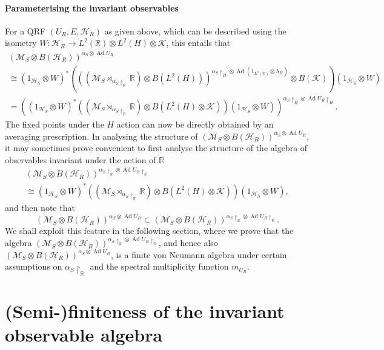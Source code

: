 \documentclass[sn-mathphys-num]{sn-jnl}%
\newcommand{\RR}{\mathbb{R}}
\newcommand{\HH}{\mathcal{H}}
\newcommand{\KK}{\mathcal{K}}
\newcommand{\MM}{\mathcal{M}}
\DeclareMathOperator{\Ad}{Ad}
\numberwithin{equation}{section}
\theoremstyle{thmstyleone}%
\theoremstyle{thmstyletwo}%
\theoremstyle{thmstylethree}%
\begin{document}
\paragraph{Parameterising the invariant observables} For a QRF $(U_R,E,\HH_R)$ as given above, which can be described using the isometry $W:\HH_R\to L^2(\RR)\otimes L^2(H)\otimes \KK$, this entails that
\begin{multline}
    \left(\MM_S\otimes B(\HH_R)\right)^{\alpha_S\otimes \Ad U_R}\\\cong(1_{\HH_S}\otimes W)^*\left(\left((\MM_S\rtimes_{\alpha_S\restriction_{\RR}} \RR)\otimes B( L^2(H))\right)^{\alpha_S\restriction_H\otimes \Ad (1_{L^2(\RR)}\otimes \lambda_H)}\otimes B(\KK)\right)(1_{\HH_S}\otimes W)\\=\left((1_{\HH_S}\otimes W)^*\left((\MM_S\rtimes_{\alpha_S\restriction_{\RR}} \RR)\otimes B( L^2(H)\otimes \KK)\right)(1_{\HH_S}\otimes W)\right)^{\alpha_S\restriction_H\otimes\Ad U_R\restriction_H}.
\end{multline}
The fixed points under the $H$ action can now be directly obtained by an averaging prescription. In analysing the structure of $\left(\MM_S\otimes B(\HH_R)\right)^{\alpha_S\otimes \Ad U_R}$, 
it may sometimes prove convenient to first analyse the structure of the algebra of observables invariant under the action of $\RR$ 
\begin{multline}
    \left(\MM_S\otimes B(\HH_R)\right)^{\alpha_S\restriction_\RR\otimes \Ad U_R\restriction_\RR}\\\cong (1_{\HH_S}\otimes W)^*\left((\MM_S\rtimes_{\alpha_S\restriction_{\RR}} \RR)\otimes B( L^2(H)\otimes \KK)\right)(1_{\HH_S}\otimes W),
\end{multline}
and then note that 
\begin{equation}
    \left(\MM_S\otimes B(\HH_R)\right)^{\alpha_S\otimes \Ad U_R}\subset \left(\MM_S\otimes B(\HH_R)\right)^{\alpha_S\restriction_\RR\otimes \Ad U_R\restriction_\RR}.
\end{equation}
We shall exploit this feature in the following section, where we prove that the algebra $\left(\MM_S\otimes B(\HH_R)\right)^{\alpha_S\restriction_\RR\otimes \Ad U_R\restriction_\RR}$, and hence also $\left(\MM_S\otimes B(\HH_R)\right)^{\alpha_S\otimes \Ad U_R}$, is a finite von Neumann algebra under certain assumptions on $\alpha_S\restriction_\RR$ and the spectral multiplicity function $m_{U_R}$.


\section{(Semi-)finiteness of the invariant observable algebra}
\label{sec:type_change} 
\end{document}
